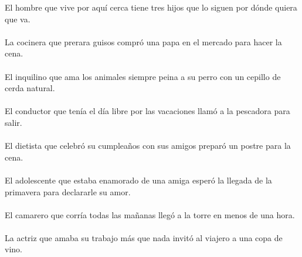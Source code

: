 El hombre que vive por aqu\'{i} cerca tiene tres hijos que lo siguen por d\'{o}nde quiera que va.	\\	\\
La cocinera que prerara guisos compr\'{o} una papa en el mercado para hacer la cena.	\\	\\
El inquilino que ama los animales siempre peina a su perro con un cepillo de cerda natural.	\\	\\
El conductor que ten\'{i}a el d\'{i}a libre por las vacaciones llam\'{o} a la pescadora para salir.	\\	\\
El dietista que celebr\'{o} su cumplea\~{n}os con sus amigos prepar\'{o} un postre para la cena.	\\	\\
El adolescente que estaba enamorado de una amiga esper\'{o} la llegada de la primavera para declararle su amor.	\\	\\
El camarero que corr\'{i}a todas las ma\~{n}anas lleg\'{o} a la torre en menos de una hora.	\\	\\
La actriz que amaba su trabajo m\'{a}s que nada invit\'{o} al viajero a una copa de vino.	\\	\\

